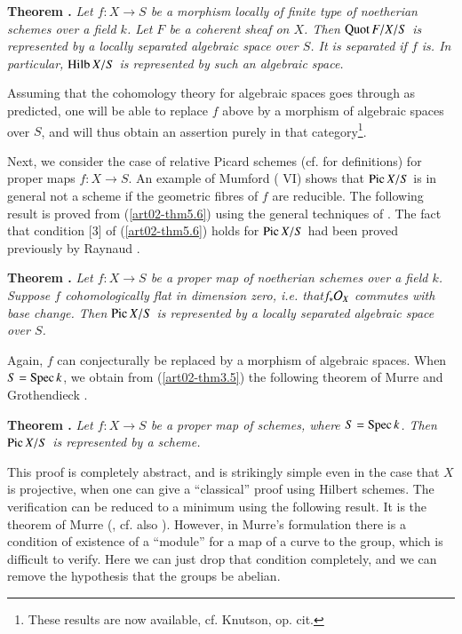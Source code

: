 \medskip
\noindent
{\bf Theorem .\label{art02-thm6.1}}
{\em Let $f:X\to S$ be a morphism locally of finite type of noetherian schemes over a field $k$. Let $F$ be a coherent sheaf on $X$. Then $\operatorname{\mathrm{Quot}} F/X/S$ is represented by a locally separated algebraic space over $S$. It is separated if $f$ is. In particular, $\operatorname{\mathrm{Hilb}} X/S$ is represented by such an algebraic space.}
\smallskip

\noindent
Assuming that the cohomology theory for algebraic spaces goes through as predicted, one will be able to replace $f$ above by a morphism of algebraic spaces over $S$, and will thus obtain an assertion purely in that category\footnote{These results are now available, cf. Knutson, op. cit.}. 

Next, we consider the case of relative Picard schemes (cf. \cite{art02-key13} for definitions) for proper maps $f:X\to S$. An example of Mumford (\cite{art02-key13} VI) shows that $\operatorname{\mathrm{Pic}} X/S$ is in general not a scheme if the geometric fibres of $f$ are reducible. The following result is proved from (\ref{art02-thm5.6}) using the general techniques of \cite{art02-key13}. The fact that condition [3] of (\ref{art02-thm5.6}) holds for $\operatorname{\mathrm{Pic}} X/S$ had been proved previously by Raynaud \cite{art02-key30}.

\medskip
\noindent
{\bf Theorem .\label{art02-thm6.2}}
{\em Let $f:X\to S$ be a proper map of noetherian schemes over a field $k$. Suppose $f$ cohomologically flat in dimension zero, i.e. that\pageoriginale $f_{*}\mathcal{O}_{X}$ commutes with base change. Then $\operatorname{\mathrm{Pic}} X/S$ is represented by a locally separated algebraic space over $S$.}
\smallskip

\noindent
Again, $f$ can conjecturally be replaced by a morphism of algebraic spaces. When $S=\operatorname{Spec} k$, we obtain from (\ref{art02-thm3.5}) the following theorem of Murre and Grothendieck \cite{art02-key27}.

\medskip
\noindent
{\bf Theorem .\label{art02-thm6.3}}
{\em Let $f:X\to S$ be a proper map of schemes, where $S=\operatorname{Spec} k$. Then $\operatorname{\mathrm{Pic}} X/S$ is represented by a scheme.}
\smallskip

This proof is completely abstract, and is strikingly simple even in the case that $X$ is projective, when one can give a ``classical'' proof using Hilbert schemes. The verification can be reduced to a minimum using the following result. It is the theorem of Murre (\cite{art02-key27}, cf. also \cite{art02-key23}). However, in Murre's formulation there is a condition of existence of a ``module'' for a map of a curve to the group, which is difficult to verify. Here we can just drop that condition completely, and we can remove the hypothesis that the groups be abelian.

